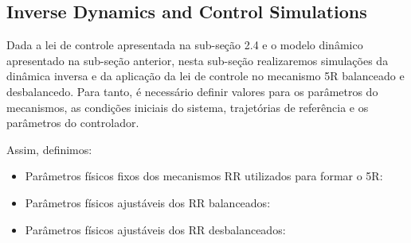 \subsection{Inverse Dynamics and Control Simulations}\label{S04-4}

Dada a lei de controle apresentada na sub-se\c{c}\~ao 2.4 e o modelo din\^amico apresentado na sub-se\c{c}\~ao anterior, nesta sub-se\c{c}\~ao realizaremos simula\c{c}\~oes da din\^amica inversa e da aplica\c{c}\~ao da lei de controle no mecanismo 5R balanceado e desbalancedo. Para tanto, \'e necess\'ario definir valores para os par\^ametros do mecanismos, as condi\c{c}\~oes iniciais do sistema, trajetórias de referência e os par\^ametros do controlador.

Assim, definimos:

\begin{itemize}
\item Par\^ametros físicos fixos dos mecanismos RR utilizados para formar o 5R:

\begin{itemize}
\end{itemize}

\item Par\^ametros físicos ajustáveis dos RR balanceados:

\begin{itemize}
\end{itemize}

\item Par\^ametros físicos ajustáveis dos RR desbalanceados:


\end{itemize}
